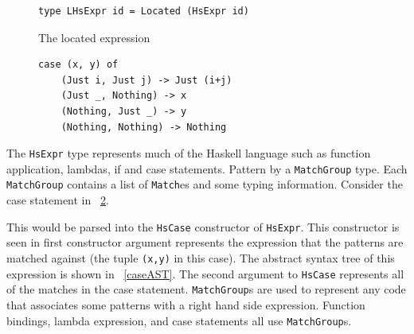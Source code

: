 \begin{figure}[t]
\begin{lstlisting}
type LHsExpr id = Located (HsExpr id)
\end{lstlisting}
\caption{The located expression}
\label{lhsexpr}
\end{figure}

\DIFaddbegin \begin{figure}[t]
\begin{lstlisting}
case (x, y) of
	(Just i, Just j) -> Just (i+j)	
	(Just _, Nothing) -> x
	(Nothing, Just _) -> y
	(Nothing, Nothing) -> Nothing
\end{lstlisting}
\caption{}
\label{caseStmt}
\end{figure}

\DIFaddend The \texttt{HsExpr} type represents much of the Haskell language such as function application, lambdas, if and case statements. Pattern \DIFdelbegin {}\DIFdelend \DIFaddbegin {}\DIFaddend by a \texttt{MatchGroup} type. Each \texttt{MatchGroup} contains a list of \texttt{Match}es and some typing information. Consider the case statement in \DIFdelbegin {}\DIFdelend \DIFaddbegin {}\DIFaddend ~\ref{caseStmt}. \DIFdelbegin %

{%
}

\DIFdelend This would be parsed into the \texttt{HsCase} constructor of \texttt{HsExpr}. This constructor is seen in \DIFdelbegin {}\DIFdelend \DIFaddbegin {}\DIFaddend first constructor argument represents the expression that the patterns are matched against \DIFdelbegin \DIFdel{, }\DIFdelend (the tuple \texttt{(x,y)} in this case). The abstract syntax tree of this expression is shown in \DIFdelbegin {}\DIFdelend \DIFaddbegin {}\DIFaddend ~\ref{caseAST}. The second argument to \texttt{HsCase} represents all \DIFdelbegin {}\DIFdelend of the matches in the case statement. \texttt{MatchGroup}s are used to represent any code that associates some patterns with a right hand side expression. Function bindings, lambda expression, and case statements all use \texttt{MatchGroup}s. 

